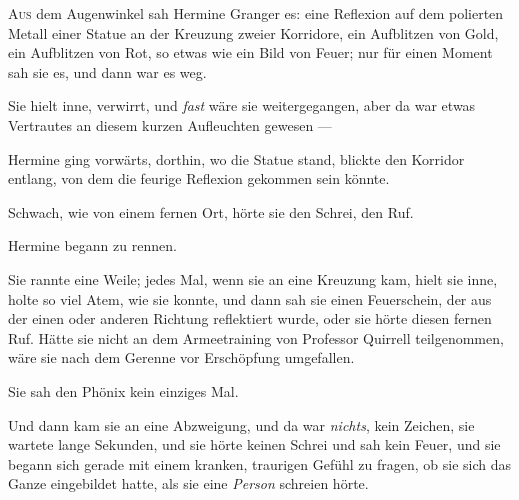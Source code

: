 
\lettrine{A}{us} dem Augenwinkel sah Hermine Granger es: eine Reflexion auf dem polierten Metall einer Statue an der Kreuzung zweier Korridore, ein Aufblitzen von Gold, ein Aufblitzen von Rot, so etwas wie ein Bild von Feuer; nur für einen Moment sah sie es, und dann war es weg.

Sie hielt inne, verwirrt, und \emph{fast} wäre sie weitergegangen, aber da war etwas Vertrautes an diesem kurzen Aufleuchten gewesen —

Hermine ging vorwärts, dorthin, wo die Statue stand, blickte den Korridor entlang, von dem die feurige Reflexion gekommen sein könnte.

Schwach, wie von einem fernen Ort, hörte sie den Schrei, den Ruf.

Hermine begann zu rennen.

Sie rannte eine Weile; jedes Mal, wenn sie an eine Kreuzung kam, hielt sie inne, holte so viel Atem, wie sie konnte, und dann sah sie einen Feuerschein, der aus der einen oder anderen Richtung reflektiert wurde, oder sie hörte diesen fernen Ruf. Hätte sie nicht an dem Armeetraining von Professor Quirrell teilgenommen, wäre sie nach dem Gerenne vor Erschöpfung umgefallen.

Sie sah den Phönix kein einziges Mal.

Und dann kam sie an eine Abzweigung, und da war \emph{nichts}, kein Zeichen, sie wartete lange Sekunden, und sie hörte keinen Schrei und sah kein Feuer, und sie begann sich gerade mit einem kranken, traurigen Gefühl zu fragen, ob sie sich das Ganze eingebildet hatte, als sie eine \emph{Person} schreien hörte.

